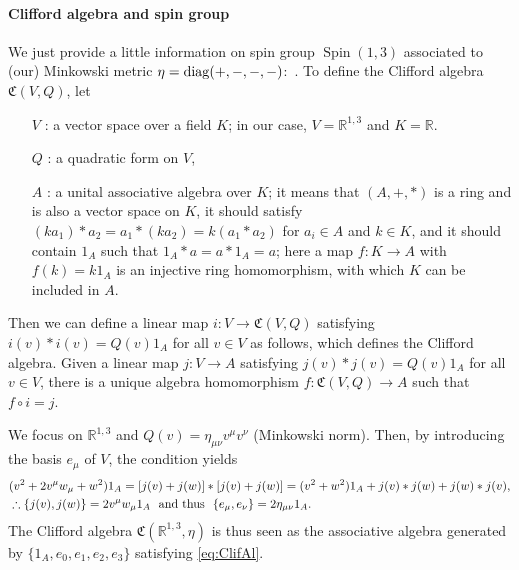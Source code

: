 \documentclass[CheatSheet]{subfiles}
\begin{document}
\paragraph{Clifford algebra and spin group}
We just provide a little information on spin group $\mathop{\mathrm Spin}(1,3)$ associated to (our) Minkowski metric $\eta=\operatorname{\mathrm{diag}}(+,-,-,-)$:~\cite{RauschdeTraubenberg:2005aa,Wikipedia:Clifford_Algebra}. To define the Clifford algebra $\mathfrak C(V,Q)$, let
\begin{itemize}
 \item[$V$]: a vector space over a field $K$; in our case, $V=\mathbb R^{1,3}$ and $K=\mathbb R$.
 \item[$Q$]: a quadratic form on $V$,
 \item[$A$]: %
  a unital associative algebra over $K$; it means that $(A, +, \ast)$ is a ring and is also a vector space on $K$, it should satisfy
  $(k a_1)\ast a_2=a_1\ast(ka_2)=k(a_1\ast a_2)$ for $a_i\in A$ and $k\in K$, and it should contain $1_A$ such that $1_A\ast a=a\ast 1_A=a$;
  here a map $f:K\to A$ with $f(k)=k1_A$ is an injective ring homomorphism, with which $K$ can be included in $A$.
\end{itemize}
Then we can define a linear map $i:V\to \mathfrak C(V,Q)$ satisfying $i(v)\ast i(v)=Q(v)1_A$ for all $v\in V$ as follows, which defines the Clifford algebra.
Given a linear map $j:V\to A$ satisfying $j(v)\ast j(v)=Q(v)1_A$ for all $v\in V$, there is a unique algebra homomorphism $f:\mathfrak C(V,Q)\to A$ such that $f\circ i=j$.

We focus on $\mathbb R^{1,3}$ and $Q(v)=\eta_{\mu\nu}v^\mu v^\nu$ (Minkowski norm). Then, by introducing the basis $e_\mu$ of $V$, the condition yields
\begin{align}
& (v^2+2v^\mu w_\mu + w^2)1_A = [j(v)+j(w)]\ast[j(v)+j(w)] = (v^2+w^2)1_A+j(v)\ast j(w)+j(w)\ast j(v),\notag\\
&\therefore \{j(v),j(w)\}=2v^\mu w_\mu 1_A
\text{~~and thus~~} \{e_\mu,e_\nu\}=2\eta_{\mu\nu} 1_A.\label{eq:ClifAl}
\end{align}
The Clifford algebra $\mathfrak C(\mathbb R^{1,3},\eta)$ is thus seen as the associative algebra generated by $\{1_A, e_0, e_1, e_2, e_3\}$ satisfying \cref{eq:ClifAl}.
\end{document}
